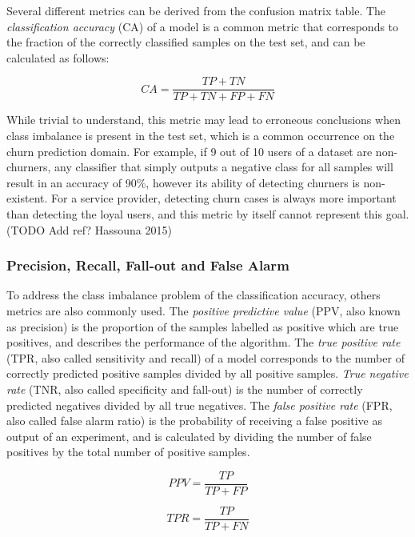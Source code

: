 \documentclass{kththesis}
\begin{document}
Several different metrics can be derived from the confusion matrix table. The \emph{classification accuracy} (CA) of a model is a common metric that corresponds to the fraction of the correctly classified samples on the test set, and can be calculated as follows:

\begin{equation}
CA = \frac{TP + TN}{TP + TN + FP + FN} 
\end{equation}

While trivial to understand, this metric may lead to erroneous conclusions when class imbalance is present in the test set, which is a common occurrence on the churn prediction domain. For example, if 9 out of 10 users of a dataset are non-churners, any classifier that simply outputs a negative class for all samples will result in an accuracy of 90\%, however its ability of detecting churners is non-existent. For a service provider, detecting churn cases is always more important than detecting the loyal users, and this metric by itself cannot represent this goal. (TODO Add ref? Hassouna 2015)

\subsubsection{Precision, Recall, Fall-out and False Alarm}

To address the class imbalance problem of the classification accuracy, others metrics are also commonly used. The \emph{positive predictive value} (PPV, also known as precision) is the proportion of the samples labelled as positive which are true positives, and describes the performance of the algorithm. The \emph{true positive rate} (TPR, also called sensitivity and recall) of a model corresponds to the number of correctly predicted positive samples divided by all positive samples. \emph{True negative rate} (TNR, also called specificity and fall-out) is the number of correctly predicted negatives divided by all true negatives. The \emph{false positive rate} (FPR, also called false alarm ratio) is the probability of receiving a false positive as output of an experiment, and is calculated by dividing the number of false positives by the total number of positive samples.

\begin{equation}
PPV = \frac{TP}{TP + FP}
\end{equation}

\begin{equation}
TPR = \frac{TP}{TP + FN}
\end{equation}
\end{document}
